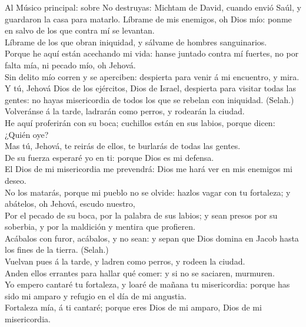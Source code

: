  Al Músico principal: sobre No destruyas: Michtam de
David, cuando envió Saúl, y guardaron la casa para matarlo. Líbrame de
mis enemigos, oh Dios mío: ponme en salvo de los que contra mí se
levantan.\\
 Líbrame de los que obran iniquidad, y sálvame de hombres
sanguinarios.\\
 Porque he aquí están acechando mi vida: hanse juntado
contra mí fuertes, no por falta mía, ni pecado mío, oh Jehová.\\
 Sin delito mío corren y se aperciben: despierta para
venir á mi encuentro, y mira.\\
 Y tú, Jehová Dios de los ejércitos, Dios de Israel,
despierta para visitar todas las gentes: no hayas misericordia de todos
los que se rebelan con iniquidad. (Selah.)\\
 Volveránse á la tarde, ladrarán como perros, y rodearán
la ciudad.\\
 He aquí proferirán con su boca; cuchillos están en sus
labios, porque dicen: ¿Quién oye?\\
 Mas tú, Jehová, te reirás de ellos, te burlarás de todas
las gentes.\\
 De su fuerza esperaré yo en ti: porque Dios es mi
defensa.\\
 El Dios de mi misericordia me prevendrá: Dios me hará
ver en mis enemigos mi deseo.\\
 No los matarás, porque mi pueblo no se olvide: hazlos
vagar con tu fortaleza; y abátelos, oh Jehová, escudo nuestro,\\
 Por el pecado de su boca, por la palabra de sus labios;
y sean presos por su soberbia, y por la maldición y mentira que
profieren.\\
 Acábalos con furor, acábalos, y no sean: y sepan que
Dios domina en Jacob hasta los fines de la tierra. (Selah.)\\
 Vuelvan pues á la tarde, y ladren como perros, y rodeen
la ciudad.\\
 Anden ellos errantes para hallar qué comer: y si no se
saciaren, murmuren.\\
 Yo empero cantaré tu fortaleza, y loaré de mañana tu
misericordia: porque has sido mi amparo y refugio en el día de mi
angustia.\\
 Fortaleza mía, á ti cantaré; porque eres Dios de mi
amparo, Dios de mi misericordia.

